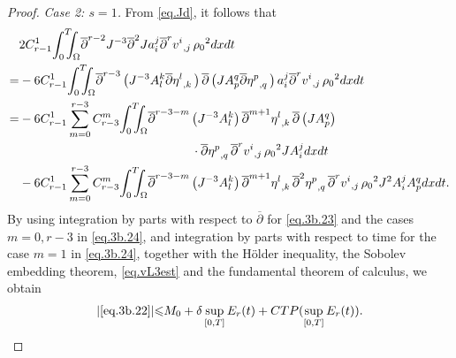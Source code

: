 \documentclass[12pt,twoside,reqno]{amsart}
\numberwithin{equation}{section}
\theoremstyle{definition}
\theoremstyle{remark}
\begin{document}
\begin{proof}
\emph{Case 2: $s=1$.} From \eqref{eq.Jd}, it follows that
\begin{align}
  &2C_{r-1}^1 {\int_0^T\!\!\!\!\int_\Omega } {\overline{\partial}}^{r-2} J^{-3}{\overline{\partial}}^2 J a^j_i{{{{\overline{\partial}}^r v^i}}_{,{j}}\,}{\rho_0}^2 dxdt\label{eq.3b.22}\\
  =&-6C_{r-1}^1  {\int_0^T\!\!\!\!\int_\Omega } {\overline{\partial}}^{r-3}\left( J^{-3}A^k_l{{{{\overline{\partial}}\eta^l}}_{,{k}}\,}\right){\overline{\partial}}\left( JA^q_p{{{{\overline{\partial}}\eta^p}}_{,{q}}\,}\right) a^j_i{{{{\overline{\partial}}^r v^i}}_{,{j}}\,}{\rho_0}^2 dxdt{\nonumber}\\
  =&-6C_{r-1}^1 \sum_{m=0}^{r-3}C_{r-3}^m {\int_0^T\!\!\!\!\int_\Omega } {\overline{\partial}}^{r-3-m}\left( J^{-3}A^k_l\right){{{{\overline{\partial}}^{m+1}\eta^l}}_{,{k}}\,}{\overline{\partial}}\left( JA^q_p\right)\label{eq.3b.23}\\
  &\qquad\qquad\qquad\qquad\qquad\qquad\qquad\cdot{{{{\overline{\partial}}\eta^p}}_{,{q}}\,} {{{{\overline{\partial}}^r v^i}}_{,{j}}\,}{\rho_0}^2 JA^j_i dxdt{\nonumber}\\
  &-6C_{r-1}^1  \sum_{m=0}^{r-3}C_{r-3}^m{\int_0^T\!\!\!\!\int_\Omega } {\overline{\partial}}^{r-3-m}\left( J^{-3}A^k_l\right){{{{\overline{\partial}}^{m+1}\eta^l}}_{,{k}}\,} {{{{\overline{\partial}}^2\eta^p}}_{,{q}}\,} {{{{\overline{\partial}}^r v^i}}_{,{j}}\,}{\rho_0}^2 J^2 A^j_i A^q_p dxdt.\label{eq.3b.24}
\end{align}
By using integration by parts with respect to ${\overline{\partial}}$ for \eqref{eq.3b.23} and the cases $m=0, r-3$ in \eqref{eq.3b.24}, and integration by parts with respect to time for the case $m=1$ in \eqref{eq.3b.24}, together with the H\"older inequality, the Sobolev embedding theorem, \eqref{eq.vL3est} and the fundamental theorem of calculus, we obtain
\begin{align*}
  {\vert{\eqref{eq.3b.22}}\vert}{\leqslant}  M_0+\delta \sup_{[0,T]}E_r(t)+CTP(\sup_{[0,T]}E_r(t)).
\end{align*}


\end{proof}
\end{document}
